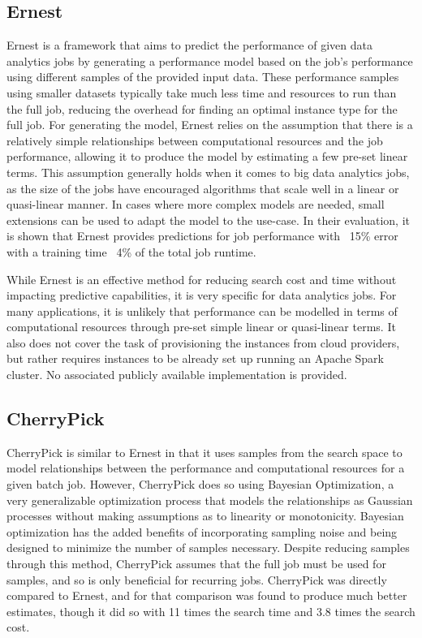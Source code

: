 \documentclass{report}
\begin{document}
\subsection{Ernest}
Ernest\cite{Venkataraman2016} is a framework that aims to predict the performance of given data analytics jobs by generating a performance model based on the job's performance using different samples of the provided input data. These performance samples using smaller datasets typically take much less time and resources to run than the full job, reducing the overhead for finding an optimal instance type for the full job. For generating the model, Ernest relies on the assumption that there is a relatively simple relationships between computational resources and the job performance, allowing it to  produce the model by estimating a few pre-set linear terms. This assumption generally holds when it comes to big data analytics jobs, as the size of the jobs have encouraged algorithms that scale well in a linear or quasi-linear manner\cite{Bottou2008}. In cases where more complex models are needed, small extensions can be used to adapt the model to the use-case. In their evaluation, it is shown that Ernest provides predictions for job performance with ~15\% error with a training time ~4\% of the total job runtime.

While Ernest is an effective method for reducing search cost and time without impacting predictive capabilities, it is very specific for data analytics jobs. For many applications, it is unlikely that performance can be modelled in terms of computational resources through pre-set simple linear or quasi-linear terms. It also does not cover the task of provisioning the instances from cloud providers, but rather requires instances to be already set up running an Apache Spark cluster. No associated publicly available implementation is provided.

\subsection{CherryPick}
CherryPick \cite{Alipourfard2017} is similar to Ernest in that it uses samples from the search space to model relationships between the performance and computational resources for a given batch job. However, CherryPick does so using Bayesian Optimization, a very generalizable optimization process that models the relationships as Gaussian processes without making assumptions as to linearity or monotonicity. Bayesian optimization has the added benefits of incorporating sampling noise and being designed to minimize the number of samples necessary. Despite reducing samples through this method, CherryPick assumes that the full job must be used for samples, and so is only beneficial for recurring jobs. CherryPick was directly compared to Ernest, and for that comparison was found to produce much better estimates, though it did so with 11 times the search time and 3.8 times the search cost\cite{Alipourfard2017}. 
\end{document}
